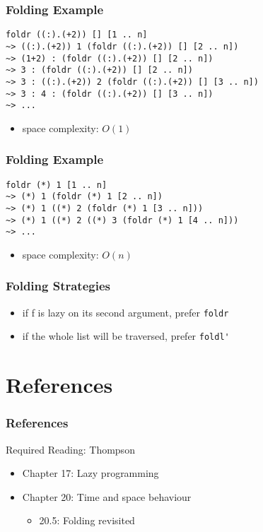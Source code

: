 \documentclass[dvipsnames]{beamer}
\theoremstyle{plain}
\begin{document}
\begin{frame}[fragile]
  \frametitle{Folding Example}

  \begin{lstlisting}
foldr ((:).(+2)) [] [1 .. n]
~> ((:).(+2)) 1 (foldr ((:).(+2)) [] [2 .. n])
~> (1+2) : (foldr ((:).(+2)) [] [2 .. n])
~> 3 : (foldr ((:).(+2)) [] [2 .. n])
~> 3 : ((:).(+2)) 2 (foldr ((:).(+2)) [] [3 .. n])
~> 3 : 4 : (foldr ((:).(+2)) [] [3 .. n])
~> ...
  \end{lstlisting}

  \begin{itemize}
    \item space complexity: $O(1)$
  \end{itemize}
\end{frame}

\begin{frame}[fragile]
  \frametitle{Folding Example}

  \begin{lstlisting}
foldr (*) 1 [1 .. n]
~> (*) 1 (foldr (*) 1 [2 .. n])
~> (*) 1 ((*) 2 (foldr (*) 1 [3 .. n]))
~> (*) 1 ((*) 2 ((*) 3 (foldr (*) 1 [4 .. n]))
~> ...
  \end{lstlisting}

  \begin{itemize}
    \item space complexity: $O(n)$
  \end{itemize}
\end{frame}

\begin{frame}[fragile]
  \frametitle{Folding Strategies}

  \begin{itemize}
    \item if f is lazy on its second argument, prefer \lstinline|foldr|
    \item if the whole list will be traversed, prefer \lstinline|foldl'|
  \end{itemize}
\end{frame}

\section*{References}

\begin{frame}
  \frametitle{References}

  \begin{block}{Required Reading: Thompson}
    \begin{itemize}
      \item Chapter 17: \alert{Lazy programming}
      \item Chapter 20: Time and space behaviour
      \begin{itemize}
        \item 20.5: \alert{Folding revisited}
      \end{itemize}
    \end{itemize}
  \end{block}
\end{frame}
\end{document}
